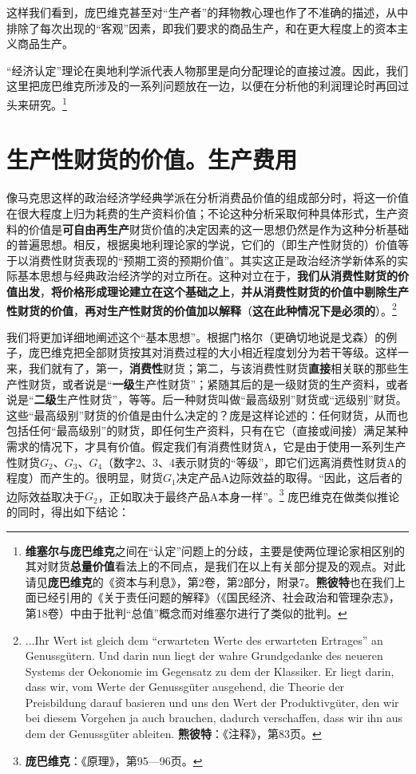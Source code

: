 \documentclass[fontset=fandol, a4paper, 12pt, openright]{ctexbook}
\begin{document}
这样我们看到，庞巴维克甚至对“生产者”的拜物教心理也作了不准确的描述，从中排除了每次出现的“客观”因素，即我们要求的商品生产，和在更大程度上的资本主义商品生产。

“经济认定”理论在奥地利学派代表人物那里是向分配理论的直接过渡。因此，我们这里把庞巴维克所涉及的一系列问题放在一边，以便在分析他的利润理论时再回过头来研究。\footnote{\textbf{维塞尔与庞巴维克}之间在“认定”问题上的分歧，主要是使两位理论家相区别的其对财货\textbf{总量价值}看法上的不同点，是我们在以上有关部分提及的观点。对此请见\textbf{庞巴维克}的《资本与利息》，第2卷，第2部分，附录7。\textbf{熊彼特}也在我们上面已经引用的《关于责任问题的解释》（《国民经济、社会政治和管理杂志》，第18卷）中由于批判“总值”概念而对维塞尔进行了类似的批判。}

\section{生产性财货的价值。生产费用}

像马克思这样的政治经济学经典学派在分析消费品价值的组成部分时，将这一价值在很大程度上归为耗费的生产资料价值；不论这种分析采取何种具体形式，生产资料的价值是\textbf{可自由再生产}财货价值的决定因素的这一思想仍然是作为这种分析基础的普遍思想。相反，根据奥地利理论家的学说，它们的（即生产性财货的）价值等于以消费性财货表现的“预期工资的预期价值”。其实这正是政治经济学新体系的实际基本思想与经典政治经济学的对立所在。这种对立在于，\textbf{我们从消费性财货的价值出发}，\textbf{将价格形成理论建立在这个基础之上}，\textbf{并从消费性财货的价值中剔除生产性财货的价值}，\textbf{再对生产性财货的价值加以解释}（\textbf{这在此种情况下是必须的}）。\footnote{...Ihr Wert ist gleich dem ``erwarteten Werte des erwarteten Ertrages'' an Genussg\"{u}tern. Und darin nun liegt der wahre Grundgedanke des neueren Systems der Oekonomie im Gegensatz zu dem der Klassiker. Er liegt darin, dass wir, vom Werte der Genussg\"{u}ter ausgehend, die Theorie der Preisbildung darauf basieren und uns den Wert der Produktivg\"{u}ter, den wir bei diesem Vorgehen ja auch brauchen, dadurch verschaffen, dass wir ihn aus dem der Genussg\"{u}ter ableiten. \textbf{熊彼特}：《注释》，第83页。}

我们将更加详细地阐述这个“基本思想”。根据门格尔（更确切地说是戈森）的例子，庞巴维克把全部财货按其对消费过程的大小相近程度划分为若干等级。这样一来，我们就有了，第一，\textbf{消费性}财货；第二，与该消费性财货\textbf{直接}相关联的那些生产性财货，或者说是“\textbf{一级}生产性财货”；紧随其后的是一级财货的生产资料，或者说是“\textbf{二级}生产性财货”，等等。后一种财货叫做“最高级别”财货或“远级别”财货。这些“最高级别”财货的价值是由什么决定的？庞是这样论述的：任何财货，从而也包括任何“最高级别”的财货，即任何生产资料，只有在它（直接或间接）满足某种需求的情况下，才具有价值。假定我们有消费性财货A，它是由于使用一系列生产性财货$G_2$、$G_3$、$G_4$（数字2、3、4表示财货的“等级”，即它们远离消费性财货A的程度）而产生的。很明显，财货$G_1$决定产品A边际效益的取得。“因此，这后者的边际效益取决于$G_2$，正如取决于最终产品A本身一样”。\footnote{\textbf{庞巴维克}：《原理》，第95—96页。} 庞巴维克在做类似推论的同时，得出如下结论：
\end{document}
